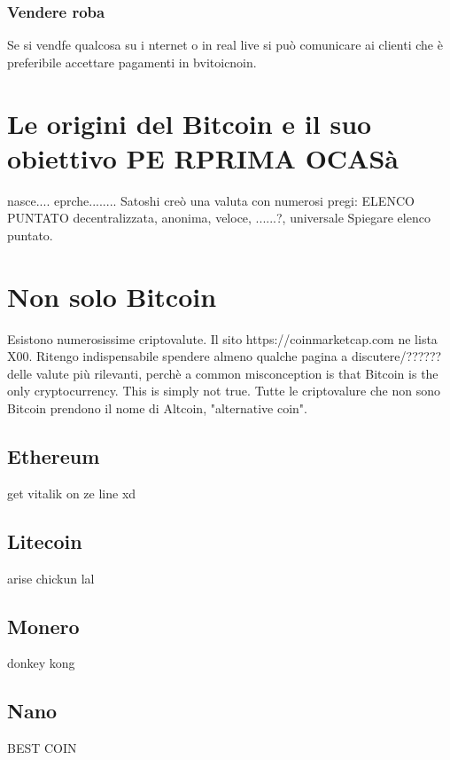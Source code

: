 \documentclass {article}
\begin{document}
\subsubsection {Vendere roba}

Se si vendfe qualcosa su i nternet o in real live si può comunicare ai clienti che è preferibile accettare pagamenti in bvitoicnoin.

\section {Le origini del Bitcoin e il suo obiettivo PE RPRIMA OCASà}

nasce.... eprche........
Satoshi creò una valuta con numerosi pregi: ELENCO PUNTATO decentralizzata, anonima, veloce, ......?, universale
Spiegare elenco puntato.

\section {Non solo Bitcoin}

Esistono numerosissime criptovalute. Il sito https://coinmarketcap.com ne lista X00. Ritengo indispensabile spendere almeno qualche pagina a discutere/?????? delle valute più rilevanti, perchè a common misconception is that Bitcoin is the only cryptocurrency. This is simply not true. Tutte le criptovalure che non sono Bitcoin prendono il nome di Altcoin, "alternative coin".

\subsection {Ethereum}

get vitalik on ze line xd

\subsection {Litecoin}

arise chickun lal

\subsection {Monero}

donkey kong

\subsection {Nano}

BEST COIN
\end{document}
